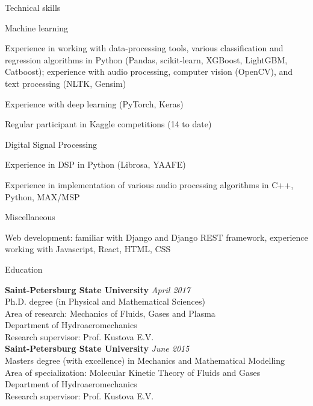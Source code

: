 \documentclass{resume} %
\begin{document}
\begin{rSection}{Technical skills}
\begin{rSubsection}{Machine learning}{}{}{}
\item Experience in working with data-processing tools, various classification and regression algorithms in Python (Pandas, scikit-learn, XGBoost, LightGBM, Catboost); experience with audio processing, computer vision (OpenCV), and text processing (NLTK, Gensim)
\item Experience with deep learning (PyTorch, Keras)
\item Regular participant in Kaggle competitions (14 to date)
\end{rSubsection}

\begin{rSubsection}{Digital Signal Processing}{}{}{}
\item Experience in DSP in Python (Librosa, YAAFE)
\item Experience in implementation of various audio processing algorithms in C++, Python, MAX/MSP
\end{rSubsection}

\begin{rSubsection}{Miscellaneous}{}{}{}
\item Web development: familiar with Django and Django REST framework, experience working with Javascript, React, HTML, CSS
\end{rSubsection}
\pagebreak
\begin{rSection}{Education}

{\bf Saint-Petersburg State University} \hfill {\em April 2017} \\ 
Ph.D. degree (in Physical and Mathematical Sciences)\\
Area of research: Mechanics of Fluids, Gases and Plasma \\
Department of Hydroaeromechanics \smallskip \\
Research supervisor: Prof. Kustova E.V. \\

{\bf Saint-Petersburg State University} \hfill {\em June 2015} \\ 
Masters degree (with excellence) in Mechanics and Mathematical Modelling\\
Area of specialization: Molecular Kinetic Theory of Fluids and Gases\\
Department of Hydroaeromechanics \smallskip \\
Research supervisor: Prof. Kustova E.V. \\


\end{rSection}
\end{rSection}
\end{document}
